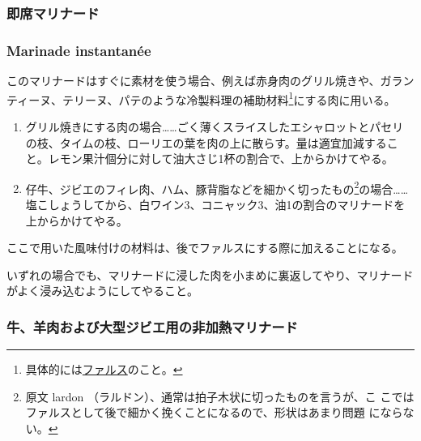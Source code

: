 \begin{recette}
\hypertarget{sokuseki-marinade}{%
\subsubsection{即席マリナード}\label{sokuseki-marinade}}

\hypertarget{marinade-instantanee}{%
\subsubsection{Marinade instantanée}\label{marinade-instantanee}}


このマリナードはすぐに素材を使う場合、例えば赤身肉のグリル焼きや、ガランティーヌ、テリーヌ、パテのような冷製料理の補助材料\footnote{具体的には\protect\hyperlink{}{ファルス}のこと。}にする肉に用いる。

\begin{enumerate}
\def\labelenumi{\arabic{enumi}.}
\item
  グリル焼きにする肉の場合\ldots{}\ldots{}ごく薄くスライスしたエシャロットとパセリの枝、タイムの枝、ローリエの葉を肉の上に散らす。量は適宜加減すること。レモン果汁\undemi{}個分に対して油大さじ1杯の割合で、上からかけてやる。
\item
  仔牛、ジビエのフィレ肉、ハム、豚背脂などを細かく切ったもの\footnote{原文
    lardon （ラルドン）、通常は拍子木状に切ったものを言うが、こ
    こではファルスとして後で細かく挽くことになるので、形状はあまり問題
    にならない。}の場合\ldots{}\ldots{}塩こしょうしてから、白ワイン3、コニャック3、油1の割合のマリナードを上からかけてやる。
\end{enumerate}

ここで用いた風味付けの材料は、後でファルスにする際に加えることになる。

いずれの場合でも、マリナードに浸した肉を小まめに裏返してやり、マリナードがよく浸み込むようにしてやること。

\maeaki

\hypertarget{ushi-hitsuji-oogatajibie-youno-hikanetsu-marinade}{%
\subsubsection{牛、羊肉および大型ジビエ用の非加熱マリナード}\label{ushi-hitsuji-oogatajibie-youno-hikanetsu-marinade}}

\hypertarget{marinade-crue-pour-viandes-de-boucherie-ou-venaison}{%
}
\end{recette}
